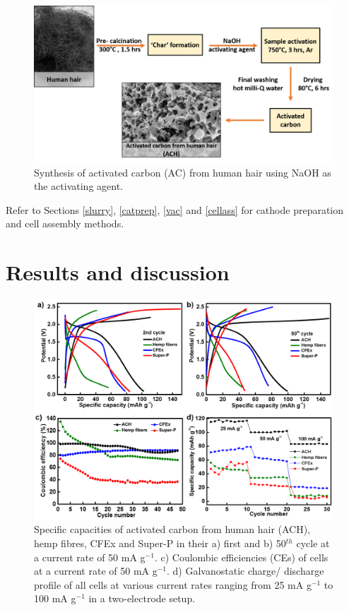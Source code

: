 \begin{figure}[h]
\centering
\includegraphics[width=35.5em]{Figures/chap5fig/achsyn}
\caption{Synthesis of activated carbon (AC) from human hair using NaOH as the activating agent.}
\label{Figures/chap5fig:achsyn}
\end{figure}
Refer to Sections \ref{slurry}, \ref{catprep}, \ref{vac} and \ref{cellass} for cathode preparation and cell assembly methods. 

\section{Results and discussion}

\begin{figure}[h]
  \centering
  \includegraphics[width=\textwidth]{Figures/chap5fig/cdcall}
    \caption{Specific capacities of activated carbon from human hair (ACH), hemp fibres, CFEx and Super-P in their a) first and b) 50$^{th}$ cycle at a current rate of 50 mA g$^{-1}$. c) Coulombic efficiencies (CEs) of cells at a current rate of 50 mA g$^{-1}$. d) Galvanostatic charge/ discharge profile of all cells at various current rates ranging from 25 mA g$^{-1}$ to 100 mA g$^{-1}$ in a two-electrode setup.}
  \label{Figures/chap5fig:cdcall}
\end{figure}

